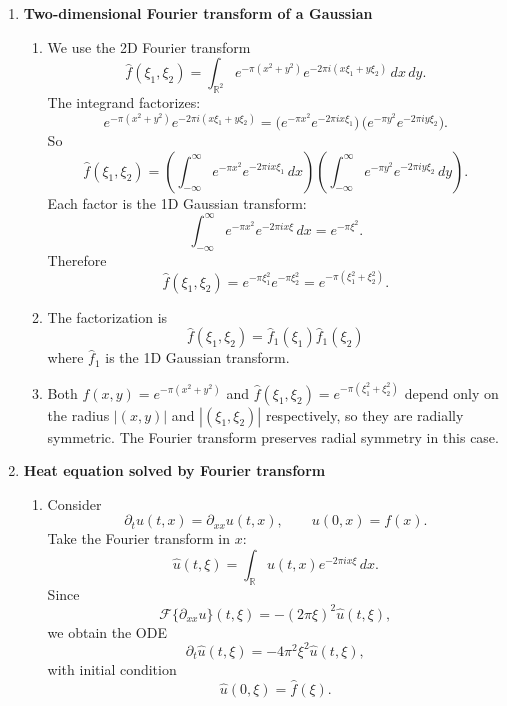 \documentclass[11pt]{article}
\begin{document}
\begin{enumerate}
\begin{enumerate}
\item As $|\xi|\to\infty$,
\[
\hat f(\xi)\sim \frac{2a}{4\pi^2\xi^2} = \mathcal{O}(|\xi|^{-2}).
\]
So the transform decays like $1/\xi^2$, which is slower than the Gaussian case (where the transform decays like $e^{-\pi\xi^2}$, much faster than any power). This matches the fact that $f$ has a ``corner'' at $0$ (nonsmooth point), while the Gaussian is infinitely smooth.
\end{enumerate}

\bigskip
\item \textbf{Two-dimensional Fourier transform of a Gaussian}

\begin{enumerate}
\item We use the 2D Fourier transform
\[
\hat f(\xi_1,\xi_2)
= \int_{\mathbb{R}^2} e^{-\pi(x^2+y^2)} e^{-2\pi i (x\xi_1+y\xi_2)}\,dx\,dy.
\]
The integrand factorizes:
\[
e^{-\pi(x^2+y^2)} e^{-2\pi i (x\xi_1+y\xi_2)}
= \big(e^{-\pi x^2}e^{-2\pi i x\xi_1}\big)\,
  \big(e^{-\pi y^2}e^{-2\pi i y\xi_2}\big).
\]
So
\[
\hat f(\xi_1,\xi_2)
= \left(\int_{-\infty}^{\infty} e^{-\pi x^2}e^{-2\pi i x\xi_1}\,dx\right)
  \left(\int_{-\infty}^{\infty} e^{-\pi y^2}e^{-2\pi i y\xi_2}\,dy\right).
\]
Each factor is the 1D Gaussian transform:
\[
\int_{-\infty}^{\infty} e^{-\pi x^2}e^{-2\pi i x\xi}\,dx = e^{-\pi\xi^2}.
\]
Therefore
\[
\hat f(\xi_1,\xi_2) = e^{-\pi\xi_1^2} e^{-\pi\xi_2^2}
= e^{-\pi(\xi_1^2+\xi_2^2)}.
\]

\item The factorization is
\[
\hat f(\xi_1,\xi_2)=\hat f_1(\xi_1)\hat f_1(\xi_2)
\]
where $\hat f_1$ is the 1D Gaussian transform.

\item Both $f(x,y)=e^{-\pi(x^2+y^2)}$ and $\hat f(\xi_1,\xi_2)=e^{-\pi(\xi_1^2+\xi_2^2)}$ depend only on the radius
\(|(x,y)|\) and \(|(\xi_1,\xi_2)|\) respectively, so they are radially symmetric. The Fourier transform preserves radial symmetry in this case.
\end{enumerate}

\bigskip
\item \textbf{Heat equation solved by Fourier transform}

\begin{enumerate}
\item Consider
\[
\partial_t u(t,x) = \partial_{xx}u(t,x),\qquad u(0,x)=f(x).
\]
Take the Fourier transform in $x$:
\[
\hat u(t,\xi)=\int_{\mathbb{R}} u(t,x)e^{-2\pi i x\xi}\,dx.
\]
Since
\[
\mathcal{F}\{\partial_{xx}u\}(t,\xi)
= -(2\pi\xi)^2\hat u(t,\xi),
\]
we obtain the ODE
\[
\partial_t \hat u(t,\xi) = -4\pi^2\xi^2\hat u(t,\xi),
\]
with initial condition
\[
\hat u(0,\xi)=\hat f(\xi).
\]


\end{enumerate}
\end{enumerate}
\end{document}
